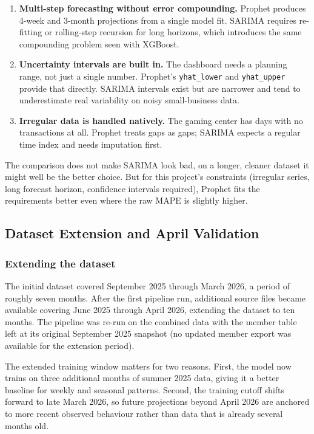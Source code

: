 \documentclass[12pt, a4paper]{report}
\begin{document}
\begin{enumerate}
  \item \textbf{Multi-step forecasting without error compounding.} Prophet
        produces 4-week and 3-month projections from a single model fit.
        SARIMA requires re-fitting or rolling-step recursion for long horizons,
        which introduces the same compounding problem seen with XGBoost.
  \item \textbf{Uncertainty intervals are built in.} The dashboard needs a
        planning range, not just a single number. Prophet's
        \texttt{yhat\_lower} and \texttt{yhat\_upper} provide that directly.
        SARIMA intervals exist but are narrower and tend to underestimate
        real variability on noisy small-business data.
  \item \textbf{Irregular data is handled natively.} The gaming center has
        days with no transactions at all. Prophet treats gaps as gaps;
        SARIMA expects a regular time index and needs imputation first.
\end{enumerate}

The comparison does not make SARIMA look bad, on a longer, cleaner dataset
it might well be the better choice. But for this project's constraints (irregular
series, long forecast horizon, confidence intervals required), Prophet fits
the requirements better even where the raw MAPE is slightly higher.

\subsection{Dataset Extension and April Validation}
\label{sec:april_validation}

\subsubsection*{Extending the dataset}

The initial dataset covered September 2025 through March 2026, a period of
roughly seven months. After the first pipeline run, additional source files
became available covering June 2025 through April 2026, extending the dataset
to ten months. The pipeline was re-run on the combined data with the member
table left at its original September 2025 snapshot (no updated member export
was available for the extension period).

The extended training window matters for two reasons. First, the model now
trains on three additional months of summer 2025 data, giving it a better
baseline for weekly and seasonal patterns. Second, the training cutoff shifts
forward to late March 2026, so future projections beyond April 2026 are anchored
to more recent observed behaviour rather than data that is already several
months old.
\end{document}
